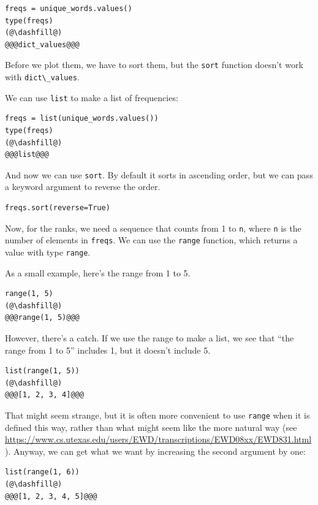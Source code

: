 \begin{lstlisting}[]
freqs = unique_words.values()
type(freqs)
(@\dashfill@)
@@@dict_values@@@
\end{lstlisting}

Before we plot them, we have to sort them, but the
\passthrough{\lstinline!sort!} function doesn't work with
\passthrough{\lstinline!dict\_values!}.

We can use \passthrough{\lstinline!list!} to make a list of frequencies:

\begin{lstlisting}[]
freqs = list(unique_words.values())
type(freqs)
(@\dashfill@)
@@@list@@@
\end{lstlisting}

And now we can use \passthrough{\lstinline!sort!}. By default it sorts
in ascending order, but we can pass a keyword argument to reverse the
order.

\begin{lstlisting}[]
freqs.sort(reverse=True)
\end{lstlisting}

Now, for the ranks, we need a sequence that counts from 1 to
\passthrough{\lstinline!n!}, where \passthrough{\lstinline!n!} is the
number of elements in \passthrough{\lstinline!freqs!}. We can use the
\passthrough{\lstinline!range!} function, which returns a value with
type \passthrough{\lstinline!range!}.

As a small example, here's the range from 1 to 5.

\begin{lstlisting}[]
range(1, 5)
(@\dashfill@)
@@@range(1, 5)@@@
\end{lstlisting}

However, there's a catch. If we use the range to make a list, we see
that ``the range from 1 to 5'' includes 1, but it doesn't include 5.

\begin{lstlisting}[]
list(range(1, 5))
(@\dashfill@)
@@@[1, 2, 3, 4]@@@
\end{lstlisting}

That might seem strange, but it is often more convenient to use
\passthrough{\lstinline!range!} when it is defined this way, rather than
what might seem like the more natural way (see
\url{https://www.cs.utexas.edu/users/EWD/transcriptions/EWD08xx/EWD831.html}).
Anyway, we can get what we want by increasing the second argument by
one:

\begin{lstlisting}[]
list(range(1, 6))
(@\dashfill@)
@@@[1, 2, 3, 4, 5]@@@
\end{lstlisting}

